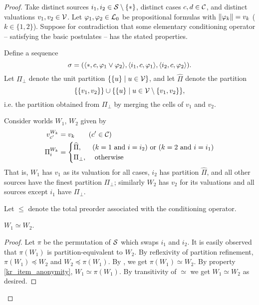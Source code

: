 \begin{proof}
    Take distinct sources $i_1, i_2 \in \mathcal{S} \setminus \{\ast\}$, distinct cases
    $c, d \in \mathcal{C}$, and distinct valuations $v_1, v_2 \in \mathcal{V}$. Let $\varphi_1,
    \varphi_2 \in \mathcal{L}{}_0$ be propositional formulas with $\|{\varphi_k}\| = v_k$
    ($k \in \{1, 2\}$). Suppose for contradiction that some elementary
    conditioning operator -- satisfying the basic postulates -- has the stated
    properties.

    Define a sequence
    \[
        \sigma
        = (
            \langle {\ast, c, \varphi_1 \lor \varphi_2} \rangle,
            \langle {i_1, c, \varphi_1} \rangle,
            \langle {i_2, c, \varphi_2} \rangle
        ).
    \]
    Let $\Pi_\bot$ denote the unit partition $\{\{u\} \mid u \in \mathcal{V}\}$, and
    let $\widehat{\Pi}$ denote the partition
    \[
         \{\{v_1, v_2\}\}
         \cup
         \{\{u\} \mid u \in \mathcal{V} \setminus \{v_1, v_2\}\},
    \]
    i.e. the partition obtained from $\Pi_\bot$ by merging the cells of $v_1$
    and $v_2$.

    Consider worlds $W_1$, $W_2$ given by
    \begin{align*}
         v^{W_k}_{c'} &= v_k \qquad (c' \in \mathcal{C}) \\
         \Pi^{W_k}_i &= \begin{cases}
            \widehat{\Pi},&
                (k = 1 \text{ and } i = i_2)
                \text { or }
                (k = 2 \text{ and } i = i_1) \\
            \Pi_\bot,& \text{ otherwise }
         \end{cases}
    \end{align*}
    That is, $W_1$ has $v_1$ as its valuation for all cases, $i_2$ has
    partition $\widehat{\Pi}$, and all other sources have the finest partition
    $\Pi_\bot$; similarly $W_2$ has $v_2$ for its valuations and all sources
    except $i_1$ have $\Pi_\bot$.

    Let $\le$ denote the total preorder associated with the conditioning
    operator.

        \begin{claim}
            \label{kr_claim_w1_simeq_w2}
            $W_1 \simeq W_2$.
        \end{claim}
        \begin{proof}
            Let $\pi$ be the permutation of $\mathcal{S}$ which swaps $i_1$ and $i_2$.
            It is easily observed that $\pi(W_1)$ is partition-equivalent to
            $W_2$. By reflexivity of partition refinement, $\pi(W_1) \preceq
            W_2$ and $W_2 \preceq \pi(W_1)$. By , we get $\pi(W_1)
            \simeq W_2$. By property \cref{kr_item_anonymity}, $W_1 \simeq
            \pi(W_1)$. By transitivity of ${\simeq}$ we get $W_1 \simeq W_2$ as
            desired.
        \end{proof}


\end{proof}
